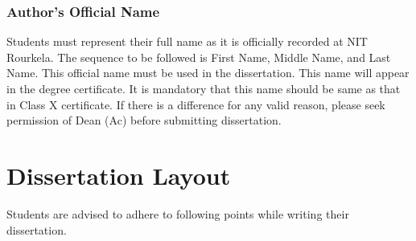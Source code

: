 \subsubsection{Author's Official Name}
Students must represent their full name as it is officially recorded at NIT Rourkela. The sequence to be followed is First Name, Middle Name, and Last Name. This official name must be used in the dissertation. This name will appear in the degree certificate. It is mandatory that this name should be same as that in Class X certificate. If there is a difference for any valid reason, please seek permission of Dean (Ac) before submitting dissertation.

\section{Dissertation Layout}
Students are advised to adhere to following points while writing their dissertation.
